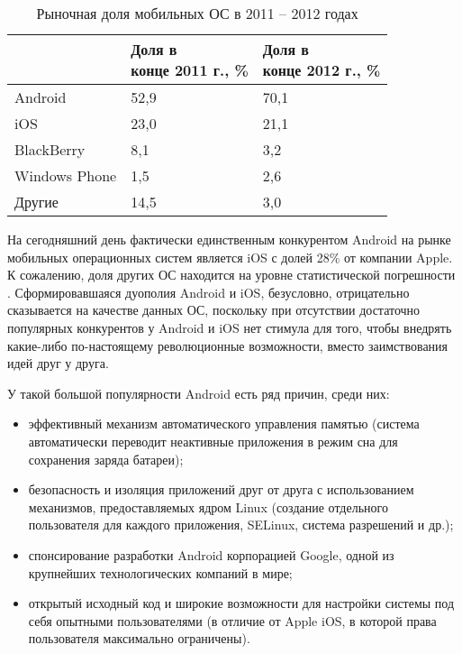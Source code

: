 \begin{table}[ht]
	\caption{Рыночная доля мобильных ОС в 2011 -- 2012 годах}
	\label{table:android_platform:comparison:market_share}
	\centering
	\begin{tabular}{| l | l | l |}
		\hline
		\thead{ОС} & \thead{Доля в \\ конце 2011 г., \%} & \thead{Доля в \\ конце 2012 г., \%}\\
		\hline Android		 & 52,9 & 70,1 \\                                             
		\hline iOS		     & 23,0 & 21,1 \\
		\hline BlackBerry	 & 8,1\ & 3,2 \\
		\hline Windows Phone & 1,5\ & 2,6 \\
		\hline Другие		 & 14,5 & 3,0 \\
		\hline
	\end{tabular}
\end{table}

На сегодняшний день фактически единственным конкурентом Android на рынке мобильных операционных систем является iOS с долей 28\% от компании Apple.
К сожалению, доля других ОС находится на уровне статистической погрешности \cite{statcounter_mobile_os}.
Сформировавшаяся дуополия Android и iOS, безусловно, отрицательно сказывается на качестве данных ОС, поскольку при отсутствии достаточно популярных конкурентов у Android и iOS нет стимула для того, чтобы внедрять какие-либо по-настоящему революционные возможности, вместо заимствования идей друг у друга.

У такой большой популярности Android есть ряд причин, среди них:
\begin{itemize}
	\item эффективный механизм автоматического управления памятью (система автоматически переводит неактивные приложения в режим сна для сохранения заряда батареи);
	\item безопасность и изоляция приложений друг от друга с использованием механизмов, предоставляемых ядром Linux (создание отдельного пользователя для каждого приложения, SELinux, система разрешений и др.);
	\item спонсирование разработки Android корпорацией Google, одной из крупнейших технологических компаний в мире;
	\item открытый исходный код и широкие возможности для настройки системы под себя опытными пользователями (в отличие от Apple iOS, в которой права пользователя максимально ограничены).
\end{itemize}

